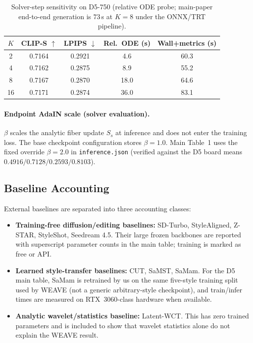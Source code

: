 \documentclass[letterpaper]{article}
\begin{document}
\begin{table}[t]
\centering
\small
\renewcommand{\arraystretch}{0.95}
\setlength{\tabcolsep}{4pt}
\begin{tabular}{@{}ccccc@{}}
\toprule
$K$ & CLIP-S $\uparrow$ & LPIPS $\downarrow$ & Rel.\ ODE (s) & Wall+metrics (s) \\
\midrule
2  & 0.7164 & 0.2921 & 4.6  & 60.3 \\
4  & 0.7162 & 0.2875 & 8.9  & 55.2 \\
8  & 0.7167 & 0.2870 & 18.0 & 64.6 \\
16 & 0.7171 & 0.2874 & 36.0 & 83.1 \\
\bottomrule
\end{tabular}
\caption{Solver-step sensitivity on D5-750 (relative ODE probe; main-paper end-to-end
generation is $73$\,s at $K{=}8$ under the ONNX/TRT pipeline).}
\label{tab:supp-k-sens}
\end{table}

\paragraph{Endpoint AdaIN scale (solver evaluation).}
$\beta$ scales the analytic fiber update $S_s$ at inference and does not enter the
training loss. The base checkpoint configuration stores $\beta{=}1.0$. Main Table~1
uses the fixed override $\beta{=}2.0$ in \texttt{inference.json} (verified against the D5
board means $0.4916/0.7128/0.2593/0.8103$).

\subsection{Baseline Accounting}

External baselines are separated into three accounting classes:
\begin{itemize}[leftmargin=1.5em,itemsep=0.2em]
  \item \textbf{Training-free diffusion/editing baselines:} SD-Turbo, StyleAligned,
  Z-STAR, StyleShot, Seedream 4.5. Their large frozen backbones are reported with
  superscript parameter counts in the main table; training is marked as free or API.
  \item \textbf{Learned style-transfer baselines:} CUT, SaMST, SaMam. For the D5 main table,
  SaMam is retrained by us on the same five-style training split used by WEAVE (not a generic
  arbitrary-style checkpoint), and train/infer times are measured on RTX~3060-class hardware
  when available.
  \item \textbf{Analytic wavelet/statistics baseline:} Latent-WCT. This has zero trained
  parameters and is included to show that wavelet statistics alone do not explain the
  WEAVE result.
\end{itemize}
\end{document}
